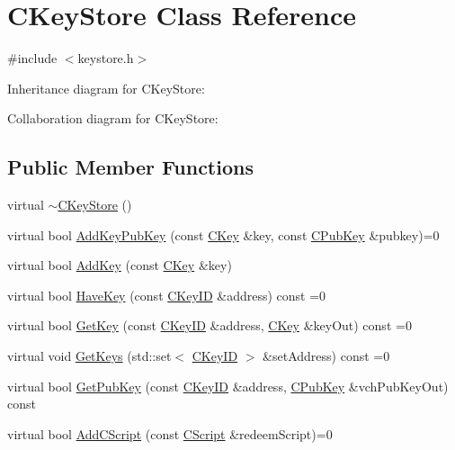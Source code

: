\hypertarget{class_c_key_store}{}\section{C\+Key\+Store Class Reference}
\label{class_c_key_store}


{\ttfamily \#include $<$keystore.\+h$>$}



Inheritance diagram for C\+Key\+Store\+:


Collaboration diagram for C\+Key\+Store\+:
\subsection*{Public Member Functions}
\begin{DoxyCompactItemize}
\item 
virtual \hyperlink{class_c_key_store_a9bfaef2bcd6effc467a96043f44044a0}{$\sim$\+C\+Key\+Store} ()
\item 
virtual bool \hyperlink{class_c_key_store_a1956e4f5860ded321d6f697047d8236a}{Add\+Key\+Pub\+Key} (const \hyperlink{class_c_key}{C\+Key} \&key, const \hyperlink{class_c_pub_key}{C\+Pub\+Key} \&pubkey)=0
\item 
virtual bool \hyperlink{class_c_key_store_a0b4ca43724cfcc6e2ea70c0baa192750}{Add\+Key} (const \hyperlink{class_c_key}{C\+Key} \&key)
\item 
virtual bool \hyperlink{class_c_key_store_a9398451d4270fae27b29f686a9d43a65}{Have\+Key} (const \hyperlink{class_c_key_i_d}{C\+Key\+I\+D} \&address) const =0
\item 
virtual bool \hyperlink{class_c_key_store_a2dffca468fef2e5da2e42a7c983d968a}{Get\+Key} (const \hyperlink{class_c_key_i_d}{C\+Key\+I\+D} \&address, \hyperlink{class_c_key}{C\+Key} \&key\+Out) const =0
\item 
virtual void \hyperlink{class_c_key_store_aca5044014720308f191113e7ba297d13}{Get\+Keys} (std\+::set$<$ \hyperlink{class_c_key_i_d}{C\+Key\+I\+D} $>$ \&set\+Address) const =0
\item 
virtual bool \hyperlink{class_c_key_store_aba866c1e71c129e7ac2d5d1e5223c8a5}{Get\+Pub\+Key} (const \hyperlink{class_c_key_i_d}{C\+Key\+I\+D} \&address, \hyperlink{class_c_pub_key}{C\+Pub\+Key} \&vch\+Pub\+Key\+Out) const 
\item 
virtual bool \hyperlink{class_c_key_store_a2fb2e02e8cdc364607efd5ebb14b8064}{Add\+C\+Script} (const \hyperlink{class_c_script}{C\+Script} \&redeem\+Script)=0
\item 

\end{DoxyCompactItemize}
